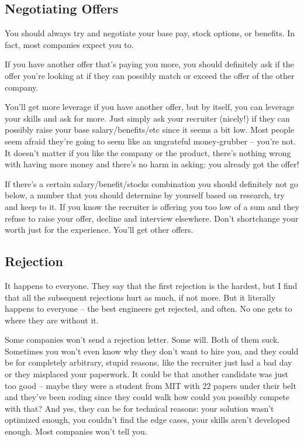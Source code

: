 \documentclass{article}
\begin{document}
\subsection {Negotiating Offers}
You should always try and negotiate your base pay, stock options, or
benefits. In fact, most companies expect you to.

If you have another offer that's paying you more, you should definitely ask if
the offer you're looking at if they can possibly match or exceed the offer of
the other company.

You'll get more leverage if you have another offer, but by itself, you can
leverage your skills and ask for more. Just simply ask your recruiter (nicely!)
if they can possibly raise your base salary/benefits/etc since it seems a bit
low. Most people seem afraid they're going to seem like an ungrateful
money-grubber -- you're not. It doesn't matter if you like the company or the
product, there's nothing wrong with having more money and there's no harm in
asking: you already got the offer!

If there's a certain salary/benefit/stocks combination you should definitely not
go below, a number that you should determine by yourself based on research, try
and keep to it. If you know the recruiter is offering you too low of a sum and
they refuse to raise your offer, decline and interview elsewhere. Don't
shortchange your worth just for the experience. You'll get other offers.

\subsection {Rejection}
It happens to everyone. They say that the first rejection is the hardest, but I
find that all the subsequent rejections hurt as much, if not more. But it
literally happens to everyone -- the best engineers get rejected, and often. No
one gets to where they are without it.

Some companies won't send a rejection letter. Some will. Both of them
suck. Sometimes you won't even know why they don't want to hire you, and they
could be for completely arbitrary, stupid reasons, like the recruiter just had a
bad day or they misplaced your paperwork. It could be that another candidate was
just too good -- maybe they were a student from MIT with 22 papers under their
belt and they've been coding since they could walk how could you possibly
compete with that? And yes, they can be for technical reasons: your solution
wasn't optimized enough, you couldn't find the edge cases, your skills aren't
developed enough. Most companies won't tell you.
\end{document}
